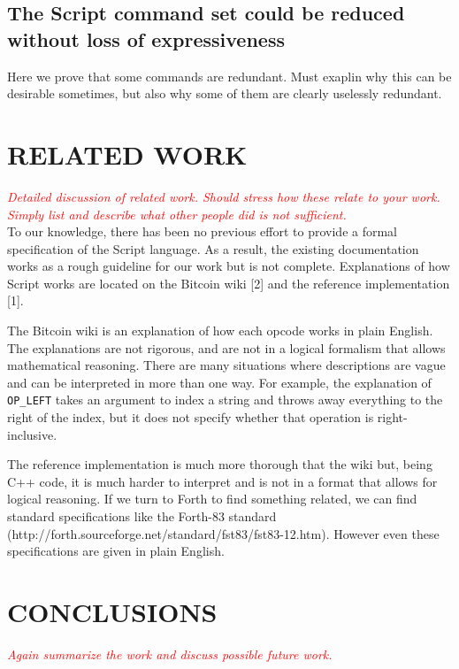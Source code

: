 \documentclass[letterpaper, 10 pt, conference]{ieeeconf}
\begin{document}
\subsection{The Script command set could be reduced without loss of expressiveness}
Here we prove that some commands are redundant. Must exaplin why this can be desirable sometimes, but also why some of them are clearly uselessly redundant.


\section{RELATED WORK}


\textcolor{red}{\textit{Detailed discussion of related work. Should stress how these relate to your work. Simply list and describe what other people did is not sufficient.}}\\

To our knowledge, there has been no previous effort to provide a formal specification of the Script language. As a result, the existing documentation works as a rough guideline for our work but is not complete. Explanations of how Script works are located on the Bitcoin wiki [2] and the reference implementation [1].  

The Bitcoin wiki is an explanation of how each opcode works in plain English. The explanations are not rigorous, and are not in a logical formalism that allows mathematical reasoning. There are many situations where descriptions are vague and can be interpreted in more than one way.  For example, the explanation of \texttt{OP\_LEFT} takes an argument to index a string and throws away everything to the right of the index, but it does not specify whether that operation is right-inclusive.

The reference implementation is much more thorough that the wiki but, being C++ code, it is much harder to interpret and is not in a format that allows for logical reasoning. If we turn to Forth to find something related, we can find standard specifications like the Forth-83 standard (http://forth.sourceforge.net/standard/fst83/fst83-12.htm). However even these specifications are given in plain English.


\section{CONCLUSIONS}

\textcolor{red}{\textit{Again summarize the work and discuss possible future work.}}\\
\end{document}
